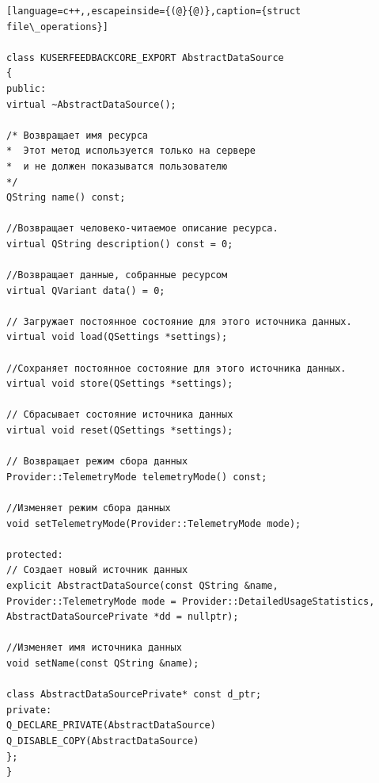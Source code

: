  \begin{lstlisting}[language=c++,,escapeinside={(@}{@)},caption={struct file\_operations}] 

class KUSERFEEDBACKCORE_EXPORT AbstractDataSource
{
public:
virtual ~AbstractDataSource();

/* Возвращает имя ресурса
*  Этот метод используется только на сервере
*  и не должен показыватся пользователю
*/
QString name() const;

//Возвращает человеко-читаемое описание ресурса.
virtual QString description() const = 0;

//Возвращает данные, собранные ресурсом
virtual QVariant data() = 0;

// Загружает постоянное состояние для этого источника данных.
virtual void load(QSettings *settings);

//Сохраняет постоянное состояние для этого источника данных.    
virtual void store(QSettings *settings);

// Сбрасывает состояние источника данных
virtual void reset(QSettings *settings);

// Возвращает режим сбора данных
Provider::TelemetryMode telemetryMode() const;

//Изменяет режим сбора данных
void setTelemetryMode(Provider::TelemetryMode mode);

protected:
// Создает новый источник данных
explicit AbstractDataSource(const QString &name, Provider::TelemetryMode mode = Provider::DetailedUsageStatistics, AbstractDataSourcePrivate *dd = nullptr);

//Изменяет имя источника данных
void setName(const QString &name);

class AbstractDataSourcePrivate* const d_ptr;
private:
Q_DECLARE_PRIVATE(AbstractDataSource)
Q_DISABLE_COPY(AbstractDataSource)
};
}

 \end{lstlisting}

